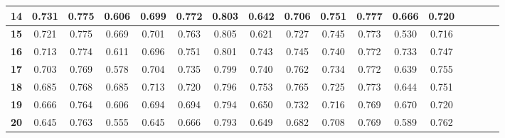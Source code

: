 \begin{table*}[!t]
\begin{tabular}{|c|c|c|c|c|c|c|c|c|c|c|c|c|c|c|c|c|}
\hline
\bfseries 14 & 0.731 & 0.775 & 0.606 & 0.699 & 0.772 & 0.803 & 0.642 & 0.706 & 0.751 & 0.777 & 0.666 & 0.720 \\
\hline
\bfseries 15 & 0.721 & 0.775 & 0.669 & 0.701 & 0.763 & 0.805 & 0.621 & 0.727 & 0.745 & 0.773 & 0.530 & 0.716 \\
\hline
\bfseries 16 & 0.713 & 0.774 & 0.611 & 0.696 & 0.751 & 0.801 & 0.743 & 0.745 & 0.740 & 0.772 & 0.733 & 0.747 \\
\hline
\bfseries 17 & 0.703 & 0.769 & 0.578 & 0.704 & 0.735 & 0.799 & 0.740 & 0.762 & 0.734 & 0.772 & 0.639 & 0.755 \\
\hline
\bfseries 18 & 0.685 & 0.768 & 0.685 & 0.713 & 0.720 & 0.796 & 0.753 & 0.765 & 0.725 & 0.773 & 0.644 & 0.751 \\
\hline
\bfseries 19 & 0.666 & 0.764 & 0.606 & 0.694 & 0.694 & 0.794 & 0.650 & 0.732 & 0.716 & 0.769 & 0.670 & 0.720 \\
\hline
\bfseries 20 & 0.645 & 0.763 & 0.555 & 0.645 & 0.666 & 0.793 & 0.649 & 0.682 & 0.708 & 0.769 & 0.589 & 0.762 \\
\hline
\end{tabular}
\end{table*}

